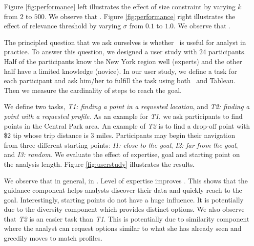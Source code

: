 Figure \ref{fig:performance} left illustrates the effect of size constraint by varying $k$ from $2$ to $500$. We observe that . Figure \ref{fig:performance} right illustrates the effect of relevance threshold by varying $\sigma$ from $0.1$ to $1.0$. We observe that .

\vspace{5pt}
The principled question that we ask ourselves is whether \framework\ is useful for analyst in practice. To answer this question, we designed a user study with $24$ participants. Half of the participants know the New York region well (experts) and the other half have a limited knowledge (novice). In our user study, we define a task for each participant and ask him/her to fulfill the task using both \framework\ and {\sc Tableau}. Then we measure the cardinality of steps to reach the goal.

We define two tasks, {\em T1: finding a point in a requested location}, and {\em T2: finding a point with a requested profile}. As an example for {\em T1}, we ask participants to find points in the Central Park area. An example of {\em T2} is to find a drop-off point with \$2 tip whose trip distance is 3 miles. Participants may begin their navigation from three different starting points: {\em I1: close to the goal}, {\em I2: far from the goal}, and {\em I3: random}. We evaluate the effect of expertise, goal and starting point on the analysis length. Figure \ref{fig:userstudy} illustrates the results.

We observe that in general,  in \framework. Level of expertise improves . This shows that the guidance component helps analysts discover their data and quickly reach to the goal. Interestingly, starting points do not have a huge influence. It is potentially due to the diversity component which provides distinct options. We also observe that {\em T2} is an easier task than {\em T1}. This is potentially due to similarity component where the analyst can request options similar to what she has already seen and greedily moves to match profiles.

